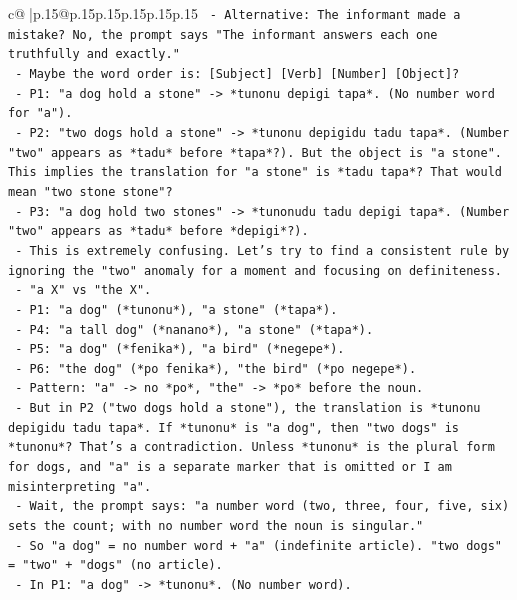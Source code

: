 \documentclass{article}
\begin{document}
{\begin{supertabular}{c@{$\;$}|p{.15\linewidth}@{}p{.15\linewidth}p{.15\linewidth}p{.15\linewidth}p{.15\linewidth}p{.15\linewidth}}
{{{\texttt{      {-} Alternative: The informant made a mistake? No, the prompt says "The informant answers each one truthfully and exactly."} \\
\texttt{      {-} Maybe the word order is: {[}Subject{]} {[}Verb{]} {[}Number{]} {[}Object{]}?} \\
\texttt{        {-} P1: "a dog hold a stone" {-}> *tunonu depigi tapa*. (No number word for "a").} \\
\texttt{        {-} P2: "two dogs hold a stone" {-}> *tunonu depigidu tadu tapa*. (Number "two" appears as *tadu* before *tapa*?). But the object is "a stone". This implies the translation for "a stone" is *tadu tapa*? That would mean "two stone stone"?} \\
\texttt{        {-} P3: "a dog hold two stones" {-}> *tunonudu tadu depigi tapa*. (Number "two" appears as *tadu* before *depigi*?).} \\
\texttt{      {-} This is extremely confusing. Let's try to find a consistent rule by ignoring the "two" anomaly for a moment and focusing on definiteness.} \\
\texttt{        {-} "a X" vs "the X".} \\
\texttt{        {-} P1: "a dog" (*tunonu*), "a stone" (*tapa*).} \\
\texttt{        {-} P4: "a tall dog" (*nanano*), "a stone" (*tapa*).} \\
\texttt{        {-} P5: "a dog" (*fenika*), "a bird" (*negepe*).} \\
\texttt{        {-} P6: "the dog" (*po fenika*), "the bird" (*po negepe*).} \\
\texttt{        {-} Pattern: "a" {-}> no *po*, "the" {-}> *po* before the noun.} \\
\texttt{        {-} But in P2 ("two dogs hold a stone"), the translation is *tunonu depigidu tadu tapa*. If *tunonu* is "a dog", then "two dogs" is *tunonu*? That's a contradiction. Unless *tunonu* is the plural form for dogs, and "a" is a separate marker that is omitted or I am misinterpreting "a".} \\
\texttt{        {-} Wait, the prompt says: "a number word (two, three, four, five, six) sets the count; with no number word the noun is singular."} \\
\texttt{        {-} So "a dog" = no number word + "a" (indefinite article). "two dogs" = "two" + "dogs" (no article).} \\
\texttt{        {-} In P1: "a dog" {-}> *tunonu*. (No number word).} \\
}}}
\end{supertabular}}
\end{document}
